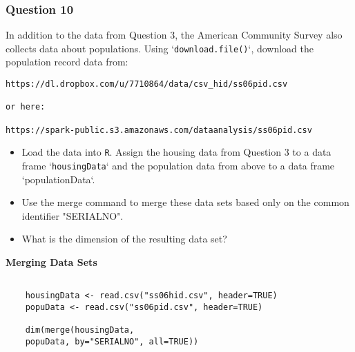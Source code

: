 \documentclass{beamer}
\begin{document}
\begin{frame}[fragile]	
\frametitle{Question 10}

In addition to the data from Question 3, the American Community Survey also collects data about populations. 
Using `\texttt{download.file()}`, download the population record data from: 

\begin{verbatim}
https://dl.dropbox.com/u/7710864/data/csv_hid/ss06pid.csv 

or here:

https://spark-public.s3.amazonaws.com/dataanalysis/ss06pid.csv
\end{verbatim}

\end{frame}
\begin{frame}[fragile]
	
\begin{itemize}
	\item Load the data into \texttt{R}. Assign the housing data from Question 3 to a data frame `\texttt{housingData}` and the population data from above to a data frame `populationData`.
	
	\item Use the merge command to merge these data sets based only on the common identifier "SERIALNO". 
	
	\item What is the dimension of the resulting data set? 
\end{itemize}

\end{frame}
\begin{frame}[fragile]
	
%	
\textbf{Merging Data Sets}
\begin{framed} 
	\begin{verbatim}

	housingData <- read.csv("ss06hid.csv", header=TRUE)
	popuData <- read.csv("ss06pid.csv", header=TRUE)
	
	dim(merge(housingData, 
	popuData, by="SERIALNO", all=TRUE))
	\end{verbatim}
\end{framed} 

\end{frame}
\end{document}
